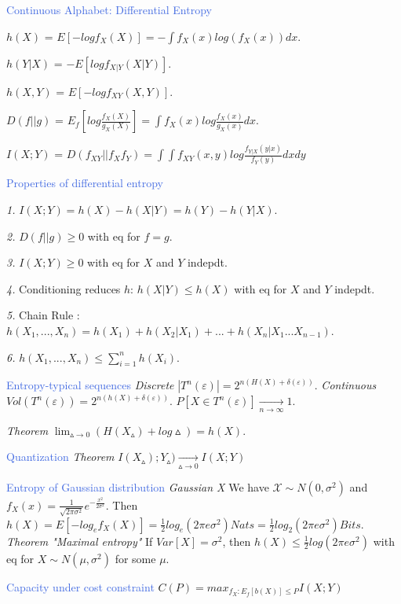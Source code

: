\documentclass[10pt,a4paper,landscape]{article}
\newcommand{\concept}[1]{\textcolor{RoyalBlue}{#1}}
\newcommand{\subconcept}[1]{\textcolor{PineGreen}{\textit{#1}}}
\begin{document}
\begin{multicols*}{4}
\concept{Continuous Alphabet: Differential Entropy}

\subconcept{$h(X)$} = $E[-log f_X(X)] = -\int f_X(x) log(f_X(x)) dx$.

\subconcept{$h(Y|X)$} = $-E[log f_{X|Y}(X|Y)]$.

\subconcept{$h(X,Y)$} = $E[-log f_{X Y}(X,Y)]$.

\subconcept{$D(f||g)$} = $E_f[log \frac{f_X(X)}{g_X(X)}]
= \int f_X(x) log \frac{f_X(x)}{g_X(x)} dx$.

\subconcept{$I(X;Y)$} = $D(f_{X Y}||f_X f_Y) 
= \int \int f_{X Y}(x,y) log \frac{f_{Y|X}(y|x)}{f_Y(y)} dxdy$

\concept{Properties of differential entropy}

\subconcept{1.} $I(X;Y)=h(X)-h(X|Y)=h(Y)-h(Y|X)$.

\subconcept{2.} $D(f||g) \ge 0$ with eq for $f=g$.

\subconcept{3.} $I(X;Y) \ge 0$ with eq for $X$ and $Y$ indepdt.

\subconcept{4.} Conditioning reduces $h$:
$h(X|Y) \le h(X)$ with eq for $X$ and $Y$ indepdt.

\subconcept{5.} Chain Rule : $h(X_1,...,X_n)=h(X_1)+h(X_2|X_1)+...+h(X_n|X_1...X_{n-1})$.

\subconcept{6.} $h(X_1,...,X_n) \le \sum_{i=1}^n h(X_i)$.
 
\concept{Entropy-typical sequences}
\subconcept{Discrete} $|T^n(\varepsilon)|=2^{n(H(X)+\delta(\varepsilon))}$.
\subconcept{Continuous} $Vol(T^n(\varepsilon))=2^{n(h(X)+\delta(\varepsilon))}$.
$P[X \in T^n(\varepsilon)] \xrightarrow[n \to \infty]{} 1$.

\subconcept{Theorem} $\lim_{\vartriangle \to 0} (H(X_\vartriangle) + log \vartriangle) = h(X)$.
 
\concept{Quantization} 
\subconcept{Theorem} 
$I(X_\vartriangle);Y_\vartriangle) \xrightarrow[\vartriangle \to 0]{} I(X;Y)$

\concept{Entropy of Gaussian distribution}
\subconcept{Gaussian X} We have $\mathcal{X} \sim N(0,\sigma^2)$ and $f_X(x)=\frac{1}{\sqrt{2\pi \sigma^2}} e^{-\frac{x^2}{2\sigma^2}}$.
Then $h(X)=E[-log_e f_X(X)]=\frac{1}{2} log_e(2\pi e \sigma^2) Nats 
= \frac{1}{2} log_2(2\pi e \sigma^2) Bits$.  
\subconcept{Theorem "Maximal entropy"} If $Var[X] = \sigma^2$, then 
$h(X) \le \frac{1}{2} log(2\pi e \sigma^2)$ with eq for $X \sim N(\mu,\sigma^2)$ for some $\mu$.

\concept{Capacity under cost constraint}
$C(P)=max_{f_X:E_f[b(X)] \le P} I(X;Y)$
 

\end{multicols*}
\end{document}

